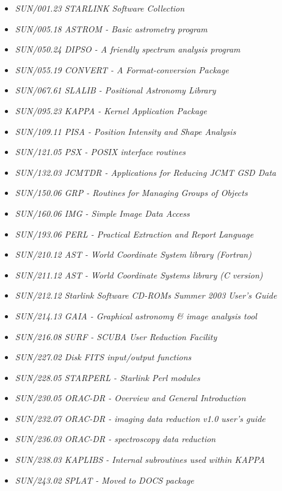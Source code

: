 \documentclass[twoside,11pt]{article}
\newcommand{\xref}[3]{#1}
\renewcommand{\_}{\texttt{\symbol{95}}}
\begin{document}
\begin{itemize}
\item \textit{\xref{SUN/001.23 STARLINK Software Collection}{sun1}{}\/}
\item \textit{\xref{SUN/005.18 ASTROM - Basic astrometry program}{sun5}{}\/}
\item \textit{\xref{SUN/050.24 DIPSO - A friendly spectrum analysis program}{sun50}{}\/}
\item \textit{\xref{SUN/055.19 CONVERT - A Format-conversion Package}{sun55}{}\/}
\item \textit{\xref{SUN/067.61 SLALIB - Positional Astronomy Library}{sun67}{}\/}
\item \textit{\xref{SUN/095.23 KAPPA - Kernel Application Package}{sun95}{}\/}
\item \textit{\xref{SUN/109.11 PISA - Position Intensity and Shape Analysis}{sun109}{}\/}
\item \textit{\xref{SUN/121.05 PSX - POSIX interface routines}{sun121}{}\/}
\item \textit{\xref{SUN/132.03 JCMTDR - Applications for Reducing JCMT GSD Data}{sun132}{}\/}
\item \textit{\xref{SUN/150.06 GRP - Routines for Managing Groups of Objects}{sun150}{}\/}
\item \textit{\xref{SUN/160.06 IMG - Simple Image Data Access}{sun160}{}\/}
\item \textit{\xref{SUN/193.06 PERL - Practical Extraction and Report Language}{sun193}{}\/}
\item \textit{\xref{SUN/210.12 AST - World Coordinate System library (Fortran)}{sun210}{}\/}
\item \textit{\xref{SUN/211.12 AST - World Coordinate Systems library (C version)}{sun211}{}\/}
\item \textit{\xref{SUN/212.12 Starlink Software CD-ROMs Summer 2003 User's Guide}{sun212}{}\/}
\item \textit{\xref{SUN/214.13 GAIA - Graphical astronomy \& image analysis tool}{sun214}{}\/}
\item \textit{\xref{SUN/216.08 SURF - SCUBA User Reduction Facility}{sun216}{}\/}
\item \textit{\xref{SUN/227.02 Disk FITS input/output functions}{sun227}{}\/}
\item \textit{\xref{SUN/228.05 STARPERL - Starlink Perl modules}{sun228}{}\/}
\item \textit{\xref{SUN/230.05 ORAC-DR - Overview and General Introduction}{sun230}{}\/}
\item \textit{\xref{SUN/232.07 ORAC-DR - imaging data reduction v1.0 user's guide}{sun232}{}\/}
\item \textit{\xref{SUN/236.03 ORAC-DR - spectroscopy data reduction}{sun236}{}\/}
\item \textit{\xref{SUN/238.03 KAPLIBS - Internal subroutines used within KAPPA}{sun238}{}\/}
\item \textit{\xref{SUN/243.02 SPLAT - Moved to DOCS package}{sun243}{}\/}
\end{itemize}
\end{document}
